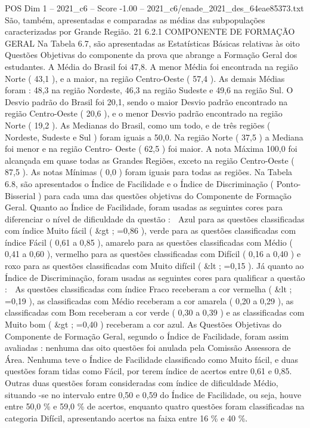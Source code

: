 \begin{textsample}{POS Dim 1 – 2021\_c6 – Score -1.00 – 2021\_c6/enade\_2021\_des\_64eae85373.txt}
São, também, apresentadas e comparadas as médias das subpopulações caracterizadas por Grande Região. 21 6.2.1 COMPONENTE DE FORMAÇÃO GERAL Na Tabela 6.7, são apresentadas as Estatísticas Básicas relativas às oito Questões Objetivas do componente da prova que abrange a Formação Geral dos estudantes.
A Média do Brasil foi 47,8.
A menor Média foi encontrada na região Norte ( 43,1 ), e a maior, na região Centro-Oeste ( 57,4 ).
As demais Médias foram : 48,3 na região Nordeste, 46,3 na região Sudeste e 49,6 na região Sul.
O Desvio padrão do Brasil foi 20,1, sendo o maior Desvio padrão encontrado na região Centro-Oeste ( 20,6 ), e o menor Desvio padrão encontrado na região Norte ( 19,2 ).
As Medianas do Brasil, como um todo, e de três regiões ( Nordeste, Sudeste e Sul ) foram iguais a 50,0.
Na região Norte ( 37,5 ) a Mediana foi menor e na região Centro- Oeste ( 62,5 ) foi maior.
A nota Máxima 100,0 foi alcançada em quase todas as Grandes Regiões, exceto na região Centro-Oeste ( 87,5 ).
As notas Mínimas ( 0,0 ) foram iguais para todas as regiões.
Na Tabela 6.8, são apresentados o Índice de Facilidade e o Índice de Discriminação ( Ponto-Bisserial ) para cada uma das questões objetivas do Componente de Formação Geral.
Quanto ao Índice de Facilidade, foram usadas as seguintes cores para diferenciar o nível de dificuldade da questão :  Azul para as questões classificadas com índice Muito fácil ( \&gt ; =0,86 ), verde para as questões classificadas com índice Fácil ( 0,61 a 0,85 ), amarelo para as questões classificadas com Médio ( 0,41 a 0,60 ), vermelho para as questões classificadas com Difícil ( 0,16 a 0,40 ) e roxo para as questões classificadas com Muito difícil ( \&lt ; =0,15 ).
Já quanto ao Índice de Discriminação, foram usadas as seguintes cores para qualificar a questão :  As questões classificadas com índice Fraco receberam a cor vermelha ( \&lt ; =0,19 ), as classificadas com Médio receberam a cor amarela ( 0,20 a 0,29 ), as classificadas com Bom receberam a cor verde ( 0,30 a 0,39 ) e as classificadas com Muito bom ( \&gt ; =0,40 ) receberam a cor azul.
As Questões Objetivas do Componente de Formação Geral, segundo o Índice de Facilidade, foram assim avaliadas : nenhuma das oito questões foi anulada pela Comissão Assessora de Área.
Nenhuma teve o Índice de Facilidade classificado como Muito fácil, e duas questões foram tidas como Fácil, por terem índice de acertos entre 0,61 e 0,85.
Outras duas questões foram consideradas com índice de dificuldade Médio, situando -se no intervalo entre 0,50 e 0,59 do Índice de Facilidade, ou seja, houve entre 50,0 \% e 59,0 \% de acertos, enquanto quatro questões foram classificadas na categoria Difícil, apresentando acertos na faixa entre 16 \% e 40 \%.

\end{textsample}
